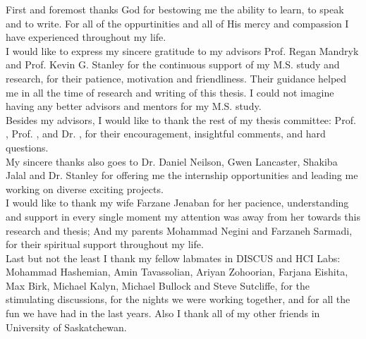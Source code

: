 First and foremost thanks God for bestowing me the ability to learn, to speak and to write. For all of the oppurtinities and all of His mercy and compassion I have experienced throughout my life.\\

I would like to express my sincere gratitude to my advisors Prof. Regan Mandryk  and Prof. Kevin G. Stanley for the continuous support of my M.S. study and research, for their patience, motivation and friendliness. Their guidance helped me in all the time of research and writing of this thesis. I could not imagine having any better advisors and mentors for my M.S. study.\\

Besides my advisors, I would like to thank the rest of my thesis committee: Prof. , Prof. , and Dr. , for their encouragement, insightful comments, and hard questions.\\

My sincere thanks also goes to Dr. Daniel Neilson, Gwen Lancaster, Shakiba Jalal and Dr. Stanley for offering me the internship opportunities and leading me working on diverse exciting projects.\\

I would like to thank my wife Farzane Jenaban for her pacience, understanding and support in every single moment my attention was away from her towards this research and thesis; And my parents Mohammad Negini and Farzaneh Sarmadi, for their spiritual support throughout my life.\\

Last but not the least I thank my fellow labmates in DISCUS and HCI Labs: Mohammad Hashemian, Amin Tavassolian, Ariyan Zohoorian, Farjana Eishita, Max Birk, Michael Kalyn, Michael Bullock and Steve Sutcliffe, for the stimulating discussions, for the nights we were working together, and for all the fun we have had in the last years. Also I thank all of my other friends in University of Saskatchewan.\\
